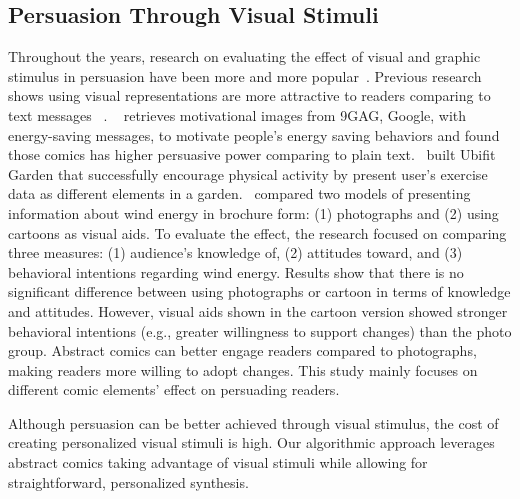 \subsection{Persuasion Through Visual Stimuli}
Throughout the years, research on evaluating the effect of visual and graphic stimulus in persuasion have been more and more popular~\cite{selker2015sweetbuildinggreeter,consolvo2008activity}. Previous research shows using visual representations are more attractive to readers comparing to text messages ~\cite{selker2015sweetbuildinggreeter,consolvo2008activity}. ~\textcite{selker2015sweetbuildinggreeter} retrieves motivational images from 9GAG, Google, with energy-saving messages, to motivate people's energy saving behaviors and found those comics has higher persuasive power comparing to plain text.~\textcite{consolvo2008activity} built Ubifit Garden that successfully encourage physical activity by present user's exercise data as different elements in a garden.~\textcite{lin2013impact} compared two models of presenting information about wind energy in brochure form: (1) photographs and (2) using cartoons as visual aids. To evaluate the effect, the research focused on comparing three measures: (1) audience's knowledge of, (2) attitudes toward, and (3) behavioral intentions regarding wind energy. Results show that there is no significant difference between using photographs or cartoon in terms of knowledge and attitudes. However, visual aids shown in the cartoon version showed stronger behavioral intentions (e.g., greater willingness to support changes) than the photo group. Abstract comics can better engage readers compared to photographs, making readers more willing to adopt changes. This study mainly focuses on different comic elements' effect on persuading readers.

Although persuasion can be better achieved through visual stimulus, the cost of creating personalized visual stimuli is high. Our algorithmic approach leverages abstract comics taking advantage of visual stimuli while allowing for straightforward, personalized synthesis.
